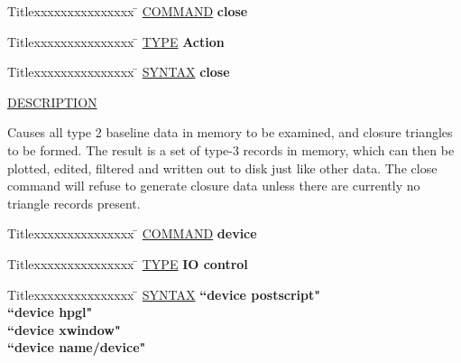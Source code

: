 \begin{tabbing}
Titlexxxxxxxxxxxxxxx \= \kill
\underline{COMMAND} \> {\bf 	close} \\
\end{tabbing}

\begin{tabbing}
Titlexxxxxxxxxxxxxxx \= \kill
\underline{TYPE} \> {\bf 		Action} \\
\end{tabbing}

\begin{tabbing}
Titlexxxxxxxxxxxxxxx \= \kill
\underline{SYNTAX} \> {\bf 		close} \\
\end{tabbing}

\underline{DESCRIPTION}
\begin{list}{}{\setlength{\leftmargin}{0.5in}
     \setlength{\rightmargin}{0in}}
\item
Causes all type 2 baseline data in memory to be examined, and 
closure triangles to be formed.  The result is a set of type-3 
records in memory, which can then be plotted, edited, filtered 
and written out to disk just like other data.  The close command 
will refuse to generate closure data unless there are currently 
no triangle records present.
\end{list}
\vspace{.2in}

\begin{tabbing}
Titlexxxxxxxxxxxxxxx \= \kill
\underline{COMMAND} \> {\bf 	device} \\
\end{tabbing}

\begin{tabbing}
Titlexxxxxxxxxxxxxxx \= \kill
\underline{TYPE} \> {\bf 		IO control} \\
\end{tabbing}

\begin{tabbing}
Titlexxxxxxxxxxxxxxx \= \kill
\underline{SYNTAX} \> {\bf 		``device postscript"} \\
\> {\bf 		``device hpgl"} \\
\> {\bf 		``device xwindow"} \\
\> {\bf 		``device name/device"} \\
\end{tabbing}

